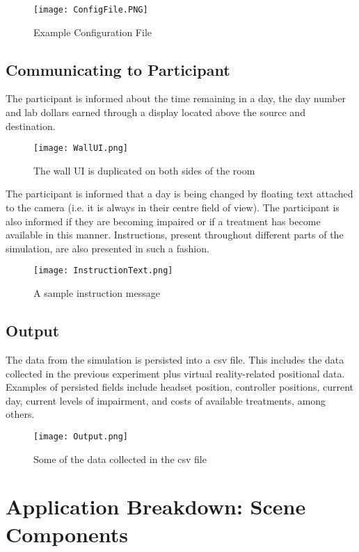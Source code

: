 \documentclass{article}
\begin{document}
\begin{figure}[h!]
\centering
\texttt{[image: ConfigFile.PNG]}
\caption{Example Configuration File}
\label{fig:configfile}
\end{figure}

\pagebreak \subsection{Communicating to Participant}
The participant is informed about the time remaining in a day, the day number and lab dollars earned through a display located above the source and destination. 

\begin{figure}[h!]
\centering
\texttt{[image: WallUI.png]}
\caption{The wall UI is duplicated on both sides of the room}
\label{fig:configfile}
\end{figure}

The participant is informed that a day is being changed by floating text attached to the camera (i.e. it is always in their centre field of view). The participant is also informed if they are becoming impaired or if a treatment has become available in this manner. Instructions, present throughout different parts of the simulation, are also presented in such a fashion.

\begin{figure}[h!]
\centering
\texttt{[image: InstructionText.png]}
\caption{A sample instruction message}
\label{fig:configfile}
\end{figure}

\subsection{Output}
The data from the simulation is persisted into a csv file. This includes the data collected in the previous experiment plus virtual reality-related positional data. Examples of persisted fields include headset position, controller positions, current day, current levels of impairment, and costs of available treatments, among others.

\begin{figure}[h!]
\centering
\texttt{[image: Output.png]}
\caption{Some of the data collected in the csv file}
\label{fig:flowchart}
\end{figure}


\section{Application Breakdown: Scene Components}
\end{document}
